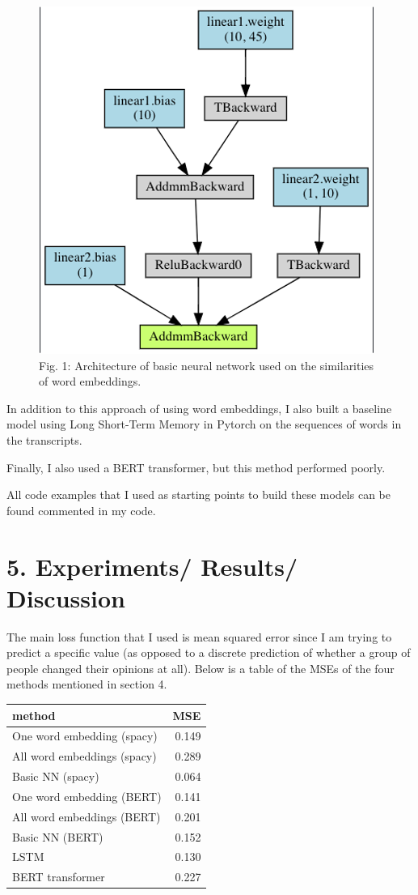 \documentclass[12pt,]{article}
\begin{document}
\begin{figure}

{\centering \includegraphics[width=0.5\linewidth]{figures/basic_nn} 

}

\caption{Fig. 1: Architecture of basic neural network used on the similarities of word embeddings.}\label{fig:unnamed-chunk-1}
\end{figure}

In addition to this approach of using word embeddings, I also built a
baseline model using Long Short-Term Memory in Pytorch on the sequences
of words in the transcripts.

Finally, I also used a BERT transformer, but this method performed
poorly.

All code examples that I used as starting points to build these models
can be found commented in my code.

\hypertarget{experiments-results-discussion}{%
\section{5. Experiments/ Results/
Discussion}\label{experiments-results-discussion}}

The main loss function that I used is mean squared error since I am
trying to predict a specific value (as opposed to a discrete prediction
of whether a group of people changed their opinions at all). Below is a
table of the MSEs of the four methods mentioned in section 4.

\begin{longtable}[]{@{}lr@{}}
\toprule
method & MSE\tabularnewline
\midrule
\endhead
One word embedding (spacy) & 0.149\tabularnewline
All word embeddings (spacy) & 0.289\tabularnewline
Basic NN (spacy) & 0.064\tabularnewline
One word embedding (BERT) & 0.141\tabularnewline
All word embeddings (BERT) & 0.201\tabularnewline
Basic NN (BERT) & 0.152\tabularnewline
LSTM & 0.130\tabularnewline
BERT transformer & 0.227\tabularnewline
\bottomrule
\end{longtable}
\end{document}
